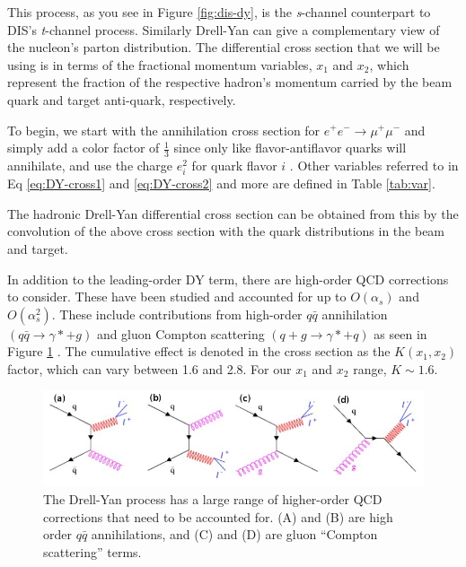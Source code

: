 This process, as you see in Figure \ref{fig:dis-dy}, is the \emph{s}-channel counterpart to DIS's \emph{t}-channel process.  Similarly Drell-Yan can give a complementary view of the nucleon's parton distribution. The differential cross section that we will be using is in terms of the fractional momentum variables, $x_1$ and $x_2$, which represent the fraction of the respective hadron's momentum carried by the beam quark and target anti-quark, respectively.

To begin, we start with the annihilation cross section for $e^+e^- \rightarrow \mu^+\mu^-$ and simply add a color factor of $\frac{1}{3}$ since only like flavor-antiflavor quarks will annihilate, and use the charge $e_i^2$ for quark flavor $i$ \cite{duan-2007-50}. Other variables referred to in Eq \ref{eq:DY-cross1} and \ref{eq:DY-cross2} and more are defined in Table \ref{tab:var}.



The hadronic Drell-Yan differential cross section can be obtained from this by the convolution of the above cross section with the quark distributions in the beam and target.



In addition to the leading-order DY term, there are high-order QCD corrections to consider. These have been studied and accounted for up to $O(\alpha_s)$ and $O(\alpha_s^2)$. These include contributions from high-order $q\bar{q}$ annihilation $(q \bar{q} \rightarrow \gamma * + g)$ and gluon Compton scattering $(q + g \rightarrow \gamma * + q)$ as seen in Figure \ref{fig:nlo-dy} \cite{duan-2007-50}. The cumulative effect is denoted in the cross section as the $K(x_1,x_2)$ factor, which can vary between 1.6 and 2.8.  For our $x_1$ and $x_2$ range, $K \sim 1.6$.

\begin{figure}[h]
	\centering
	\includegraphics[width=5.00in]{figures/background/DY.jpeg}
	\caption{The Drell-Yan process has a large range of higher-order QCD corrections that need to be accounted for. 
		(A) and (B) are high order $q\bar{q}$ annihilations, and (C) and (D) are gluon ``Compton scattering'' terms.}
	\label{fig:nlo-dy}
\end{figure}


